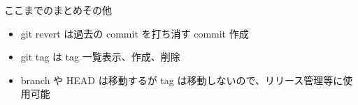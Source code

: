 
\begin{frame}[t]{ここまでのまとめ}{その他}

  \begin{itemize}
  \item git revert は過去の commit を打ち消す commit 作成
    \vspace{2ex}

  \item git tag は tag 一覧表示、作成、削除
    \vspace{2ex}

  \item branch や HEAD は移動するが tag は移動しないので、リリース管理等に使用可能
  \end{itemize}

\end{frame}
